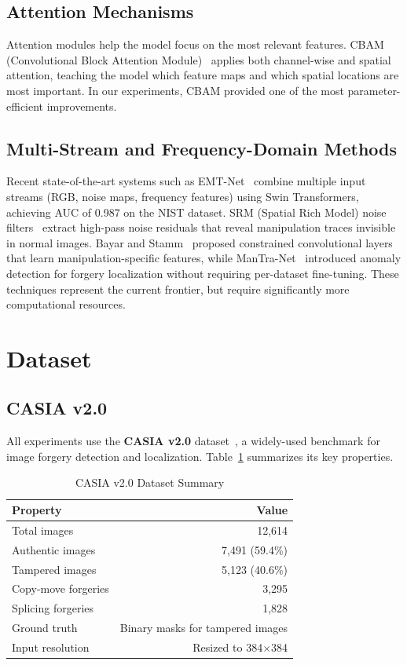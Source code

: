 \documentclass[conference]{IEEEtran}
\begin{document}
\subsection{Attention Mechanisms}

Attention modules help the model focus on the most relevant features. CBAM (Convolutional Block Attention Module)~\cite{woo2018cbam} applies both channel-wise and spatial attention, teaching the model which feature maps and which spatial locations are most important. In our experiments, CBAM provided one of the most parameter-efficient improvements.

\subsection{Multi-Stream and Frequency-Domain Methods}

Recent state-of-the-art systems such as EMT-Net~\cite{emtnet2023} combine multiple input streams (RGB, noise maps, frequency features) using Swin Transformers, achieving AUC of 0.987 on the NIST dataset. SRM (Spatial Rich Model) noise filters~\cite{fridrich2012srm} extract high-pass noise residuals that reveal manipulation traces invisible in normal images. Bayar and Stamm~\cite{bayar2018constrained} proposed constrained convolutional layers that learn manipulation-specific features, while ManTra-Net~\cite{wu2019mantranet} introduced anomaly detection for forgery localization without requiring per-dataset fine-tuning. These techniques represent the current frontier, but require significantly more computational resources.


\section{Dataset}

\subsection{CASIA v2.0}

All experiments use the \textbf{CASIA v2.0} dataset~\cite{dong2013casia}, a widely-used benchmark for image forgery detection and localization. Table~\ref{tab:dataset} summarizes its key properties.

\begin{table}[H]
\centering
\caption{CASIA v2.0 Dataset Summary}
\label{tab:dataset}
\begin{tabular}{l r}
\toprule
\textbf{Property} & \textbf{Value} \\
\midrule
Total images & 12,614 \\
Authentic images & 7,491 (59.4\%) \\
Tampered images & 5,123 (40.6\%) \\
\quad Copy-move forgeries & 3,295 \\
\quad Splicing forgeries & 1,828 \\
Ground truth & Binary masks for tampered images \\
Input resolution & Resized to 384$\times$384 \\
\bottomrule
\end{tabular}
\end{table}
\end{document}
